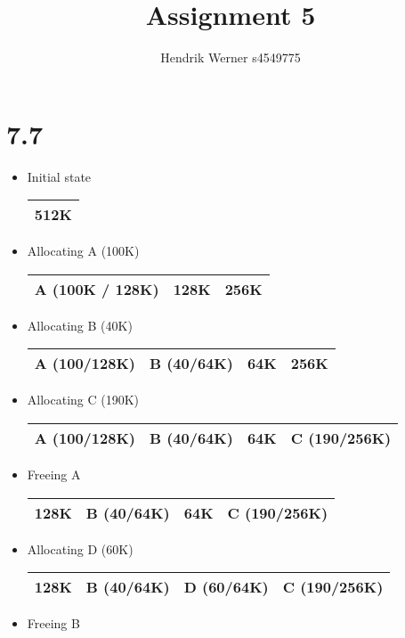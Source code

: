 \documentclass[12pt]{article}
\title{Assignment 5}
\author{Hendrik Werner s4549775}
\begin{document}
\maketitle

\section*{7.7}
	\begin{itemize}
		\item Initial state

		\begin{tabular}{|p{\linewidth}|}
			\hline
			512K\\
			\hline
		\end{tabular}
		\item Allocating A (100K)

		\begin{tabular}{|p{}|p{}|p{}|}
			\hline
			A (100K / 128K) & 128K & 256K\\
			\hline
		\end{tabular}
		\item Allocating B (40K)

		\begin{tabular}{|p{}|p{}|p{}|p{}|}
			\hline
			A (100/128K) & B (40/64K) & 64K & 256K\\
			\hline
		\end{tabular}
		\item Allocating C (190K)

		\begin{tabular}{|p{}|p{}|p{}|p{}|}
			\hline
			A (100/128K) & B (40/64K) & 64K & C (190/256K)\\
			\hline
		\end{tabular}
		\item Freeing A

		\begin{tabular}{|p{}|p{}|p{}|p{}|}
			\hline
			128K & B (40/64K) & 64K & C (190/256K)\\
			\hline
		\end{tabular}
		\item Allocating D (60K)

		\begin{tabular}{|p{}|p{}|p{}|p{}|}
			\hline
			128K & B (40/64K) & D (60/64K) & C (190/256K)\\
			\hline
		\end{tabular}
		\item Freeing B


\end{itemize}
\end{document}
